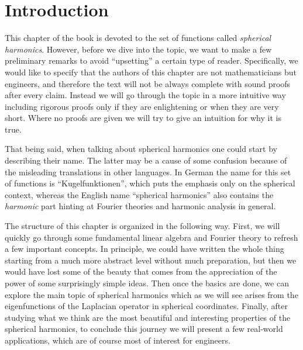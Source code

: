 
\section{Introduction}
\label{kugel:sec:intro}

This chapter of the book is devoted to the set of functions called
\emph{spherical harmonics}. However, before we dive into the topic, we want to
make a few preliminary remarks to avoid ``upsetting'' a certain type of
reader. Specifically, we would like to specify that the authors of this
chapter are not mathematicians but engineers, and therefore the text will not be
always complete with sound proofs after every claim. Instead we will go
through the topic in a more intuitive way including rigorous proofs only if
they are enlightening or when they are very short. Where no proofs are given
we will try to give an intuition for why it is true.

That being said, when talking about spherical harmonics one could start by
describing their name. The latter may be a cause of some confusion because of
the misleading translations in other languages. In German the name for this
set of functions is ``Kugelfunktionen'', which puts the emphasis only on the
spherical context, whereas the English name ``spherical harmonics'' also
contains the \emph{harmonic} part hinting at Fourier theories and harmonic
analysis in general.

The structure of this chapter is organized in the following way. First, we
will quickly go through some fundamental linear algebra and Fourier theory to
refresh a few important concepts. In principle, we could have written the
whole thing starting from a much more abstract level without much preparation,
but then we would have lost some of the beauty that comes from the
appreciation of the power of some surprisingly simple ideas. Then once the
basics are done, we can explore the main topic of spherical harmonics which as
we will see arises from the eigenfunctions of the Laplacian operator in
spherical coordinates. Finally, after studying what we think are the most
beautiful and interesting properties of the spherical harmonics, to conclude
this journey we will present a few real-world applications, which are of
course most of interest for engineers.

